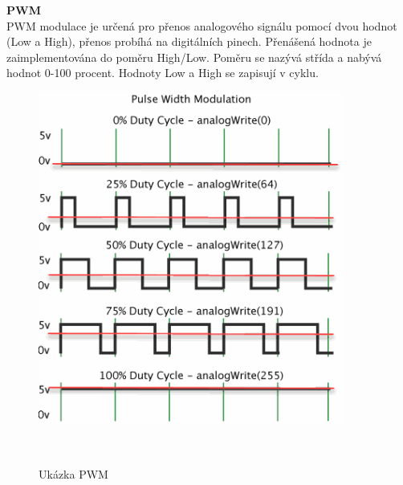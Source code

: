 \textbf{PWM}\\
PWM modulace je určená pro přenos analogového signálu pomocí dvou hodnot (Low a High), přenos probíhá na digitálních pinech. Přenášená hodnota je zaimplementována do poměru High/Low. Poměru se nazývá střída a nabývá hodnot 0-100 procent. Hodnoty Low a High se zapisují v cyklu.\\


\begin{figure}[H]
	\centering
	\includegraphics[width=10cm]{pictures/pwm.png}
	\caption{Ukázka PWM}
	\cite{pwm}\\
\end{figure}


